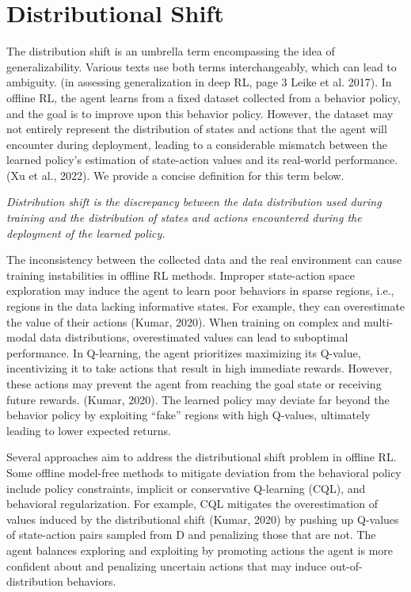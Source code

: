\section{Distributional Shift}

 The distribution shift is an umbrella term encompassing the idea of generalizability. Various texts use both terms interchangeably, which can lead to ambiguity. (in assessing generalization in deep RL, page 3 Leike et al. 2017). In offline RL, the agent learns from a fixed dataset collected from a behavior policy, and the goal is to improve upon this behavior policy. However, the dataset may not entirely represent the distribution of states and actions that the agent will encounter during deployment, leading to a considerable mismatch between the learned policy’s estimation of state-action values and its real-world performance. (Xu et al., 2022). We provide a concise definition for this term below.
\begin{flushleft}
    \textit{Distribution shift is the discrepancy between the data distribution used during training and the distribution of states and actions encountered during the deployment of the learned policy.}
\end{flushleft}


The inconsistency between the collected data and the real environment can cause training instabilities in offline RL methods. Improper state-action space exploration may induce the agent to learn poor behaviors in sparse regions, i.e., regions in the data lacking informative states. For example, they can overestimate the value of their actions (Kumar, 2020). When training on complex and multi-modal data distributions, overestimated values can lead to suboptimal performance. In Q-learning, the agent prioritizes maximizing its Q-value, incentivizing it to take actions that result in high immediate rewards. However, these actions may prevent the agent from reaching the goal state or receiving future rewards. (Kumar, 2020). The learned policy may deviate far beyond the behavior policy by exploiting “fake” regions with high Q-values, ultimately leading to lower expected returns. 

Several approaches aim to address the distributional shift problem in offline RL. Some offline model-free methods to mitigate deviation from the behavioral policy include policy constraints, implicit or conservative Q-learning (CQL), and behavioral regularization. For example, CQL mitigates the overestimation of values induced by the distributional shift (Kumar, 2020) by pushing up Q-values of state-action pairs sampled from D and penalizing those that are not. The agent balances exploring and exploiting by promoting actions the agent is more confident about and penalizing uncertain actions that may induce out-of-distribution behaviors. 


